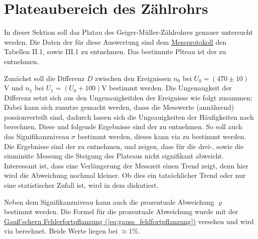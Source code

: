 \newpage

\section{Plateaubereich des Zählrohrs}
\label{sec:A1}
In dieser Sektion soll das Platau des Geiger-Müller-Zählrohres genauer untersucht werden. Die Daten der für diese Auswertung sind dem \hyperref[ch:Protokoll]{Messprotokoll} den Tabellen II.1, sowie III.1 zu entnehmen. 
Das bestimmte Plteau ist der  zu entnehmen. 

Zunächst soll die Differenz $D$ zwischen den Ereignissen $n_0$ bei $U_0 = (470 \pm 10)$V und $n_1$ bei $U_1 = (U_0 + 100)$V bestimmt werden. Die Ungenaugkeit der Differenz setzt sich aus den Ungenauigkeitden der Ereignisse wie folgt zusammen:
Dabei kann sich zunutze gemacht werden, dasss die Messwerte (annährend) possionverteilt sind, dadurch lassen sich die Ungeauigkeiten der Häufigkeiten nach 
berechnen. Diese und folgende Ergebnisse sind der  zu entnehmen. So soll auch das Signifikanzniveau $\sigma$ bestimmt werden, dieses kann via  zu
bestimmt werden. Die Ergebnisse sind der  zu entnehmen, und zeigen, dass für die drei-, sowie die einminüte Messung die Steigung des Plateaus nicht signifikant abweicht. Interessant ist, dass eine Verlängerung der Messzeit einen Trend zeigt, denn hier wird die Abweichung nochmal kleiner. Ob dies ein tatsächlicher Trend oder nur eine statistischer Zufall ist, wird in dem  diskutiert.

Neben dem Signifikanzniveau kann auch die prozentuale Abweichung $\varrho$ bestimmt werden.
Die Formel für die prozentuale Abweichung wurde mit der \hyperref[eq:gauss_fehlfortpflanzung]{Gauß'schern Fehlerfortpflanzung (\ref*{eq:gauss_fehlfortpflanzung})} versehen und wird via
berechnet. Beide Werte liegen bei $\approx 1\%$.

